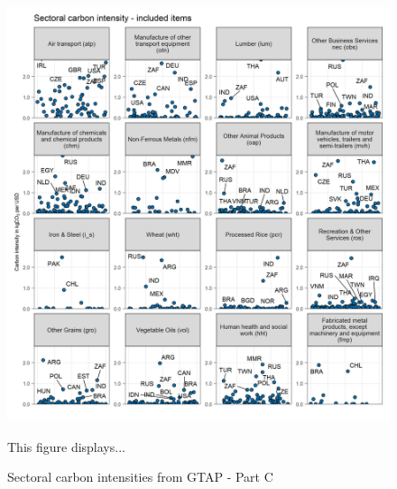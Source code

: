 \documentclass[12pt, a4paper]{article}
\newenvironment{subcaption}
{\strut
\vspace{-5pt}
\begin{minipage}[b]{0.9\textwidth}
  \hspace*{-\parindent}
  \footnotesize}
 {\end{minipage}}
\begin{document}
\begin{figure}[ht!]
  \centering
  \caption{Sectoral carbon intensities from GTAP - Part C} \label{fig:B3}
  \includegraphics{Analysis_Carbon_Intensities_GTAP/Figure_2.1.1_C_2017}
  \begin{subcaption}
    This figure displays...
  \end{subcaption}

\end{figure}

\clearpage
\end{document}
